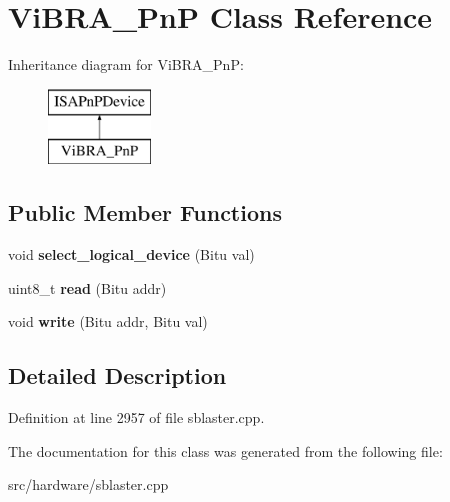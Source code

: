 \hypertarget{classViBRA__PnP}{\section{Vi\-B\-R\-A\-\_\-\-Pn\-P Class Reference}
\label{classViBRA__PnP}
}
Inheritance diagram for Vi\-B\-R\-A\-\_\-\-Pn\-P\-:\begin{figure}[H]
\begin{center}
\leavevmode
\includegraphics[height=2.000000cm]{classViBRA__PnP}
\end{center}
\end{figure}
\subsection*{Public Member Functions}
\begin{DoxyCompactItemize}
\item 
\hypertarget{classViBRA__PnP_ad5d0a168bbb86f72c44255c0b065ec1a}{void {\bfseries select\-\_\-logical\-\_\-device} (Bitu val)}\label{classViBRA__PnP_ad5d0a168bbb86f72c44255c0b065ec1a}

\item 
\hypertarget{classViBRA__PnP_ac467093f48f75b421715ebd10a676f05}{uint8\-\_\-t {\bfseries read} (Bitu addr)}\label{classViBRA__PnP_ac467093f48f75b421715ebd10a676f05}

\item 
\hypertarget{classViBRA__PnP_a9d6d3c3ad0a64c68a222f93ee3a30f31}{void {\bfseries write} (Bitu addr, Bitu val)}\label{classViBRA__PnP_a9d6d3c3ad0a64c68a222f93ee3a30f31}

\end{DoxyCompactItemize}


\subsection{Detailed Description}


Definition at line 2957 of file sblaster.\-cpp.



The documentation for this class was generated from the following file\-:\begin{DoxyCompactItemize}
\item 
src/hardware/sblaster.\-cpp\end{DoxyCompactItemize}
